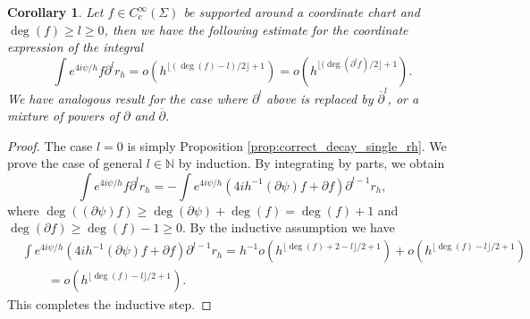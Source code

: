 \documentclass[12pt]{amsart}
\def\p{\partial}
\def\N{\mathbb N}
\newtheorem{corollary}[theorem]{Corollary}
\theoremstyle{definition}
\theoremstyle{remark}
\newcommand{\tbl}[1]{\textcolor{blue}{#1}}
\newcommand{\f}[1]{\footnote{\tbl{#1}}}
\newcommand{\op}{\overline \p}
\begin{document}
\begin{corollary}\label{cor:correct_decay_partial_rh}
 Let $f\in C_c^\infty(\Sigma)$ be supported around a coordinate chart and $\deg(f)\geq l\geq 0$, then we have the following estimate for the coordinate expression of the integral
 \[
  \int e^{4i\psi/h}f \p^l r_h=o(h^{\lfloor (\deg(f)-l)/2\rfloor +1})=o(h^{\lfloor (\deg(\p^lf)/2\rfloor +1}).
 \]
 We have analogous result for the case where $\p^l$ above is replaced by $\op^l$, or a mixture of powers of $\p$ and $\op$.
\end{corollary}
\begin{proof}
The case $l = 0$ is simply Proposition \ref{prop:correct_decay_single_rh}.  We prove the case of general $l\in \N$ by induction. By integrating by parts, we obtain
 \[
\int e^{4i\psi/h}f \p^l r_h=-   \int e^{4i\psi/h}(4ih^{-1}(\p \psi)f+  \p f) \p^{l-1}r_h,
 \]
 where $\deg((\p \psi)f)\geq \deg(\p \psi)+\deg(f)=\deg(f)+1$ and $\deg(\p f)\geq \deg(f)-1\geq 0$. By the inductive assumption we have
 \begin{align*}
  &\int e^{4i\psi/h}(4ih^{-1}(\p \psi)f+  \p f)  \p^{l-1}r_h= h^{-1} o(h^{\lfloor\deg (f) + 2 - l \rfloor/2+1}) + o(h^{\lfloor  \deg(f)  - l \rfloor/2 +1})\\&\qquad = o(h^{\lfloor  \deg(f)  - l \rfloor/2 +1}).
 \end{align*}
This completes the inductive step.
\end{proof}
\end{document}
